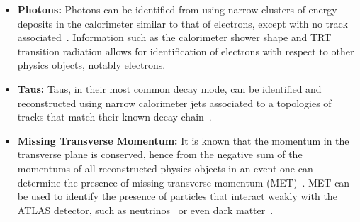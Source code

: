 \begin{itemize}[leftmargin=*]
\item\textbf{Photons:}
  Photons can be identified from using narrow clusters of energy deposits in the calorimeter similar to that of electrons,
  except with no track associated~\cite{obj-photons}.
  Information such as the calorimeter shower shape and TRT transition radiation
 allows for identification of electrons with respect to other physics objects, notably electrons.\vspace{0.5em}
\item\textbf{Taus:}
  Taus, in their most common decay mode, can be identified and reconstructed using narrow calorimeter jets
  associated to a topologies of tracks that match their known decay chain~\cite{obj-taus}.\vspace{0.5em}
\item\textbf{Missing Transverse Momentum:}
  It is known that the momentum in the transverse plane is conserved,
  hence from the negative sum of the momentums of all reconstructed physics objects in an event
  one can determine the presence of missing transverse momentum (MET)~\cite{obj-met}.
  MET can be used to identify the presence of particles that interact weakly with the ATLAS detector,
  such as neutrinos~\cite{obj-Hbb} or even dark matter~\cite{obj-met_monoJet}.
\end{itemize}
